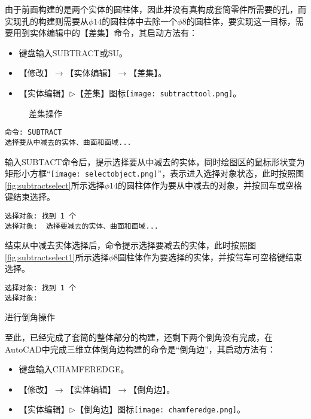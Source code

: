 \begin{procedure}
由于前面构建的是两个实体的圆柱体，因此并没有真构成套筒零件所需要的孔，而实现孔的构建则需要从$\phi 14$的圆柱体中去除一个$\phi 8$的圆柱体，要实现这一目标，需要用到实体编辑中的【差集】命令，其启动方法有：
\begin{itemize}
\item 键盘输入SUBTRACT或SU。
\item 【修改】$\rightarrow$【实体编辑】$\rightarrow$【差集】。
\item 【实体编辑】$\triangleright$【差集】图标\texttt{[image: subtracttool.png]}。
\end{itemize}
\begin{figure}[htbp]
\centering
{}\hspace{40pt}
\caption{差集操作}
\end{figure}
\begin{lstlisting}
命令: SUBTRACT
选择要从中减去的实体、曲面和面域...
\end{lstlisting}

输入SUBTACT命令后，提示选择要从中减去的实体，同时绘图区的鼠标形状变为矩形小方框“\texttt{[image: selectobject.png]}”，表示进入选择对象状态，此时按照图\ref{fig:subtractselect}所示选择$\phi 14$的圆柱体作为要从中减去的对象，并按回车或空格键结束选择。
\begin{lstlisting}
选择对象: 找到 1 个
选择对象:  选择要减去的实体、曲面和面域...
\end{lstlisting}

结束从中减去实体选择后，命令提示选择要减去的实体，此时按照图\ref{fig:subtractselect1}所示选择$\phi 8$圆柱体作为要选择的实体，并按驾车可空格键结束选择。
\begin{lstlisting}
选择对象: 找到 1 个
选择对象:
\end{lstlisting}
\item 进行倒角操作

至此，已经完成了套筒的整体部分的构建，还剩下两个倒角没有完成，在AutoCAD中完成三维立体倒角边构建的命令是“倒角边”，其启动方法有：
\begin{itemize}
\item 键盘输入CHAMFEREDGE。
\item 【修改】$\rightarrow$【实体编辑】$\rightarrow$【倒角边】。
\item 【实体编辑】$\triangleright$【倒角边】图标\texttt{[image: chamferedge.png]}。
\end{itemize}


\end{procedure}
